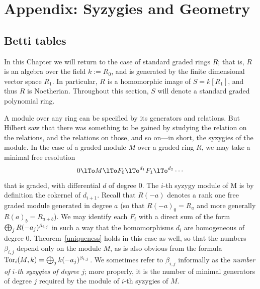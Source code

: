 


\chapter{Appendix: Syzygies and Geometry}\label{syzygy chapter}

\section{Betti tables}

 In this Chapter we will return to the case of standard graded rings $R$; that is, $R$ is an algebra over the field $k := R_0$, and is generated by the finite dimensional vector space $R_1$. In particular, $R$ is a homomorphic image of 
$S = k[R_1]$, and thus $R$ is Noetherian. Throughout this section, $S$ will denote a standard graded polynomial ring.

A module over any ring can be specified by its generators and relations. But Hilbert saw that there was something to be gained by studying the relation on the relations, and the relations on those, and so on---in short, the syzygies of the module.
In the case of a graded module $M$ over a graded ring $R$, we may take a minimal free resolution
$$
0\lTo M \lTo F_0 \lTo^{d_{1}} F_1\lTo^{d_{2}}\cdots
$$
that is graded, with differential $d$ of degree 0. The $i$-th syzygy module of M is by definition the 
cokernel of $d_{i+1}$. Recall that $R(-a)$ denotes a rank one free graded module generated in degree $a$ (so that $R(-a)_0 = R_a$ and more generally $R(a)_{b} = R_{a+b}$). We may identify each $F_i$ with a direct sum of the form 
$\bigoplus_j R(-a_j)^{\beta_{i,j}}$
in such a way that the homomorphisms $d_{i}$ are homogeneous of degree 0. 
Theorem~\ref{uniqueness} holds in this case as well, so that 
the numbers $\beta_{i,j}$ depend only on the module $M$, as is also obvious from the formula $\operatorname{Tor}_i(M,k) = \bigoplus_j k(-a_j)^{\beta_{i,j}}$.
We sometimes refer to $\beta_{i,j}$ informally as the \emph{number of $i$-th syzygies of degree $j$}; more properly, it is the number of minimal generators of degree $j$ required by the module of $i$-th syzygies of $M$.

